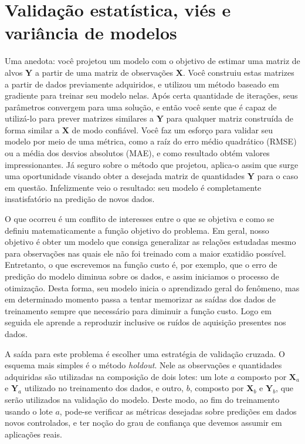     \section{Validação estatística, viés e variância de modelos} \label{s:validacao}

      Uma anedota: você projetou um modelo com o objetivo de estimar uma matriz de alvos $\boldsymbol{Y}$ a partir de uma matriz de observações $\boldsymbol{X}$. Você construiu estas matrizes a partir de dados previamente adquiridos, e utilizou um método baseado em gradiente para treinar seu modelo nelas. Após certa quantidade de iterações, seus parâmetros convergem para uma solução, e então você sente que é capaz de utilizá-lo para prever matrizes similares a $\boldsymbol{Y}$ para qualquer matriz construída de forma similar a $\boldsymbol{X}$ de modo confiável. Você faz um esforço para validar seu modelo por meio de uma métrica, como a raíz do erro médio quadrático (RMSE) ou a média dos desvios absolutos (MAE), e como resultado obtém valores impressionantes. Já seguro sobre o método que projetou, aplica-o assim que surge uma oportunidade visando obter a desejada matriz de quantidades $\boldsymbol{Y}$ para o caso em questão. Infelizmente veio o resultado: seu modelo é completamente insatisfatório na predição de novos dados.

      O que ocorreu é um conflito de interesses entre o que se objetiva e como se definiu matematicamente a função objetivo do problema. Em geral, nosso objetivo é obter um modelo que consiga generalizar as relações estudadas mesmo para observações nas quais ele não foi treinado com a maior exatidão possível. Entretanto, o que escrevemos na função custo é, por exemplo, que o erro de predição do modelo diminua sobre os dados, e assim iniciamos o processo de otimização. Desta forma, seu modelo inicia o aprendizado geral do fenômeno, mas em determinado momento passa a tentar memorizar as saídas dos dados de treinamento sempre que necessário para diminuir a função custo. Logo em seguida ele aprende a reproduzir inclusive os ruídos de aquisição presentes nos dados.

      A saída para este problema é escolher uma estratégia de validação cruzada. O esquema mais simples é o método \textit{holdout}. Nele as observações e quantidades adquiridas são utilizadas na composição de dois lotes: um lote $a$ composto por $\boldsymbol{X}_a$ e $\boldsymbol{Y}_a$ utilizado no treinamento dos dados, e outro, $b$, composto por $\boldsymbol{X}_b$ e $\boldsymbol{Y}_b$, que serão utilizados na validação do modelo. Deste modo, ao fim do treinamento usando o lote $a$, pode-se verificar as métricas desejadas sobre predições em dados novos controlados, e ter noção do grau de confiança que devemos assumir em aplicações reais.

